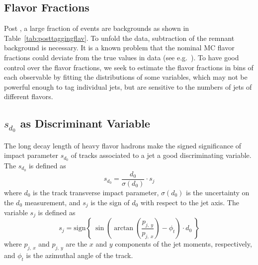 \label{sec:gbb-bkgsub}
\subsection{Flavor Fractions}
Post \btagging, a large fraction of events are backgrounds as shown in Table~\ref{tab:posttaggingflav}. To unfold the data, subtraction of the remnant background is necessary. It is a known problem that the nominal MC flavor fractions could deviate from the true values in data (see e.g.~\cite{ATLAS-CONF-2016-002}). To have good control over the flavor fractions, we seek to estimate the flavor fractions in bins of each observable by fitting the distributions of some variables, which may not be powerful enough to tag individual jets, but are sensitive to the numbers of jets of different flavors. 

\begin{table}[htbp]
\centering
{}
\caption{Post $b$-tagging flavor composition in MC. The first letter of the flavor combination is the flavor of the leading jet. The second letter of the combination is the flavor of the sub-leading jet. }
\label{tab:posttaggingflav}
\end{table}


\subsection{$s_{d_{0}}$ as Discriminant Variable }
\label{sec:gbb-sd0}

The long decay length of heavy flavor hadrons make the signed significance of impact parameter $s_{d_{0}}$ of tracks associated to a jet a good discriminating variable. The $s_{d_{0}}$ is defined as 
\begin{equation}
s_{d_{0}} = \frac{d_0}{\sigma(d_0)} \cdot s_{j}
\end{equation}
where $d_{0}$ is the track transverse impact parameter, $\sigma(d_{0})$ is the uncertainty on the $d_0$ measurement, and $s_{j}$ is the sign of $d_{0}$ with respect to the jet axis. The variable $s_j$ is defined as
\begin{equation}
s_{j} = \textrm{sign}\left\{\ \sin\left(\arctan \left( \frac{p_{j,\ y}}{p_{j,\ x}}\right) - \phi_t\right) \cdot d_{0} \ \right\}
\end{equation}
 where $p_{j,\ x}$ and $p_{j,\ y}$ are the $x$ and $y$ components of the jet moments, respectively, and $\phi_{t}$ is the azimuthal angle of the track.
 
